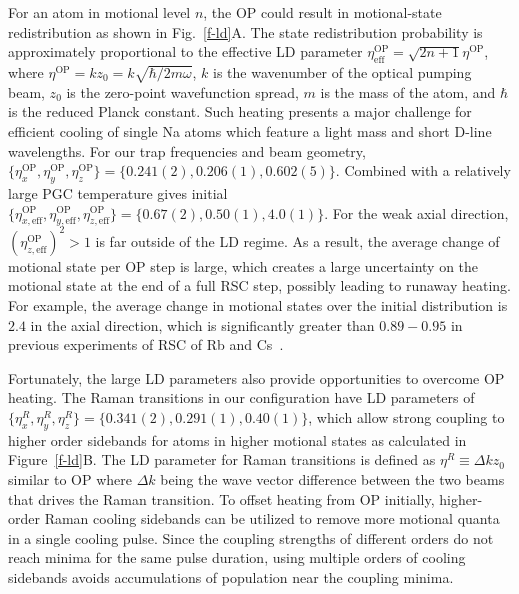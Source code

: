 \documentclass[aps,prl,twocolumn,groupedaddress]{revtex4-1}
\begin{document}
For an atom in motional level $n$, the OP could result in motional-state redistribution
as shown in Fig.~\ref{f-ld}A. The state redistribution probability
is approximately proportional to the effective LD parameter
$\eta^{\textrm{OP}}_{\textrm{eff}}=\sqrt{2n+1}\eta^{\textrm{OP}}$, where $\eta^{\textrm{OP}}=k z_0=k \sqrt{\hbar/2m\omega}$,
$k$ is the wavenumber of the optical pumping beam, $z_0$ is the zero-point wavefunction spread,
$m$ is the mass of the atom, and $\hbar$ is the reduced Planck constant.
Such heating presents a major challenge for efficient cooling of single Na atoms
which feature a light mass and short D-line wavelengths.
For our trap frequencies and beam geometry,
$\{\eta^{\textrm{OP}}_x,\eta^{\textrm{OP}}_y,\eta^{\textrm{OP}}_z\} = \{0.241(2), 0.206(1), 0.602(5)\}$.
Combined with a relatively large PGC temperature gives initial
$\{\eta^{\textrm{OP}}_{x,\textrm{eff}},\eta^{\textrm{OP}}_{y,\textrm{eff}},\eta^{\textrm{OP}}_{z,\textrm{eff}}\} = \{0.67(2), 0.50(1), 4.0(1)\}$.
For the weak axial direction, $(\eta^{\textrm{OP}}_{z,\textrm{eff}})^2>1$ is far outside of the LD regime.
As a result, the average change of motional state per OP step is large,
which creates a large uncertainty on the motional state at the end of a full RSC step, possibly leading to runaway heating.
For example, the average change in motional states over the initial distribution
is $2.4$ in the axial direction, which is significantly greater than $0.89-0.95$
in previous experiments of RSC of Rb and Cs~\cite{Li2012,Kaufman2012,Thompson2013,Liu2017}.

Fortunately, the large LD parameters also provide opportunities to overcome OP heating.
The Raman transitions in our configuration have LD parameters of
$\{\eta^R_x,\eta^R_y,\eta^R_z\} = \{0.341(2), 0.291(1), 0.40(1)\}$,
which allow strong coupling to higher order sidebands for atoms in higher motional states
as calculated in Figure~\ref{f-ld}B.
The LD parameter for Raman transitions is defined as $\eta^R\equiv\Delta k z_0$ similar to OP
where $\Delta k$ being the wave vector difference
between the two beams that drives the Raman transition.
To offset heating from OP initially, higher-order Raman cooling sidebands can be utilized
to remove more motional quanta in a single cooling pulse.
Since the coupling strengths of different orders do not reach minima for the same pulse duration,
using multiple orders of cooling sidebands avoids accumulations of population
near the coupling minima.
\end{document}
